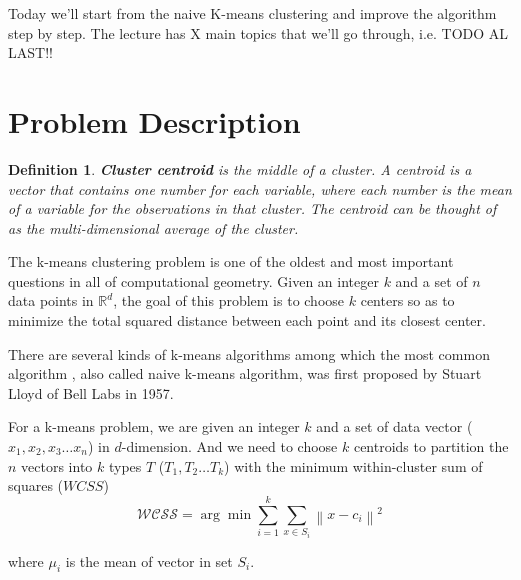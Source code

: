 \documentclass[11pt]{article}
\newtheorem{definition}[theorem]{Definition}
\begin{document}
\par Today we'll start from the naive K-means clustering and improve the algorithm step by step. The lecture has X main topics that we'll go through, i.e. TODO AL LAST!!

\section{Problem Description}
\begin{definition}
\textbf{Cluster centroid} is the middle of a cluster. A centroid is a vector that contains one number for each variable, where each number is the mean of a variable for the observations in that cluster. The centroid can be thought of as the multi-dimensional average of the cluster.
\end{definition}
\par The k-means clustering problem is one of the oldest and most important questions in all of computational geometry. Given an integer $k$ and a set of $n$ data points in $\mathbb{R}^{d}$, the goal of this problem is to choose $k$ centers so as to minimize the total squared distance between each point and its closest center.\cite{kmeanspp}
\par There are several kinds of k-means algorithms among which the most common algorithm , also called naive k-means algorithm, was first proposed by Stuart Lloyd\cite{Least-squares-quantization-in-PCM} of Bell Labs in 1957.
\par For a k-means problem, we are given an integer $k$ and a set of data vector ($x_1, x_2, x_3 \dots x_n$) in $d$-dimension. And we need to choose $k$ centroids to partition the $n$ vectors into $k$ types $T$ ($T_1, T_2 \dots T_k$) with the minimum within-cluster sum of squares ($WCSS$)
$$\mathcal{WCSS} = \arg \min \sum_{i=1}^{k} \sum_{x \in S_i } {\left\lVert x - c _i \right\rVert }^2  $$
\par where $\mu_i$ is the mean of vector in set $S_i$.
\end{document}
